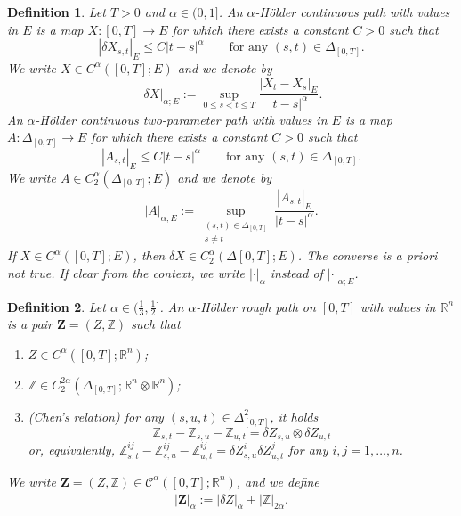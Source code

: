 \documentclass[11pt,a4paper]{article}
\newcommand{\R}{\mathbb{R}}
\newtheorem{defn}{Definition}[section]
\theoremstyle{plain}
\begin{document}
\begin{defn} Let $T>0$ and $\alpha \in (0,1]$. An $\alpha$-Hölder continuous path with values in $E$ is a map $X:[0,T] \to E$ for which there exists a constant $C>0$ such that \begin{equation*}
    |\delta X_{s,t}|_E \le C|t-s|^\alpha \qquad \text{for any $(s,t) \in \Delta_{[0,T]}$.}
\end{equation*} 
We write $X \in {C}^\alpha([0,T];E)$ and we denote by \begin{equation*}
    |\delta X|_{\alpha;E} := \sup_{0\le s < t \le T} \frac{|X_t-X_s|_E}{|t-s|^\alpha}.
\end{equation*}  
An $\alpha$-Hölder continuous two-parameter path with values in $E$ is a map $A:\Delta_{[0,T]} \to E$ for which there exists a constant $C>0$ such that \begin{equation*}
    |A_{s,t}|_E \le C|t-s|^\alpha \qquad \text{for any $(s,t) \in \Delta_{[0,T]}$.}
\end{equation*} 
We write $A \in {C}_2^\alpha(\Delta_{[0,T]};E)$ and we denote by \begin{equation*}
    |A|_{\alpha;E} := \sup_{\substack{(s,t)\in\Delta_{[0,T]}\\ s \ne t}} \frac{|A_{s,t}|_E}{|t-s|^\alpha}.
\end{equation*}
If $X \in {C}^\alpha([0,T];E)$, then $\delta X \in {C}_2^\alpha(\Delta{[0,T]};E)$. The converse is a priori not true.
If clear from the context, we write $|\cdot|_\alpha$ instead of $|\cdot|_{\alpha;E}$.
\end{defn}


\begin{defn} Let $\alpha \in (\frac13,\frac12]$.  An $\alpha$-Hölder rough path on $[0,T]$ with values in $\R^n$ is a pair $\mathbf{Z}=(Z,\mathbb{Z})$ such that \begin{enumerate}
    \item[a)] $Z \in {C}^\alpha([0,T];\R^n)$;
    \item[b)] $\mathbb{Z} \in {C}_2^{2\alpha}(\Delta_{[0,T]};\R^n \otimes \R^n) $;
    \item[c)] (Chen's relation) for any $(s,u,t) \in \Delta_{[0,T]}^2$, it holds \begin{equation*}
        \mathbb{Z}_{s,t}-\mathbb{Z}_{s,u}-\mathbb{Z}_{u,t} = \delta Z_{s,u}\otimes\delta Z_{u,t}
    \end{equation*} or, equivalently, $\mathbb{Z}_{s,t}^{ij}-\mathbb{Z}_{s,u}^{ij}-\mathbb{Z}_{u,t}^{ij} = \delta Z_{s,u}^i \delta Z_{u,t}^j$ for any $i,j=1,\dots,n$.
\end{enumerate}

We write $\mathbf{Z}=(Z,\mathbb{Z}) \in \mathscr{C}^\alpha([0,T];\R^n)$, and we define \begin{align*}
    |\mathbf{Z}|_\alpha := |\delta Z|_\alpha + |\mathbb{Z}|_{2\alpha}.
\end{align*}
\end{defn}
\end{document}
